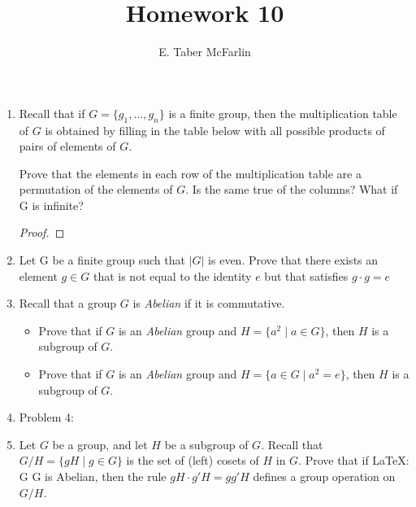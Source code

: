 \documentclass[12pt,a4paper,reqno,parskip=full]{amsart}
\numberwithin{equation}{section}
\theoremstyle{plain}
\theoremstyle{definition}
\begin{document}
\title{Homework 10}

\author{E. Taber McFarlin}

\maketitle

\begin{enumerate}
  \item Recall that if $G=\{g_1,\ldots,g_n\}$ is a finite group, then the
        multiplication table of $G$ is obtained by filling in the table below
        with all possible products of pairs of elements of $G$.

        Prove that the elements in each row of the multiplication table are a
        permutation of the elements of $G$. Is the same true of the columns?
        What if G is infinite?

        \begin{proof}

        \end{proof}

  \item Let G be a finite group such that $|G|$ is even. Prove that there exists
        an element $g\in G$ that is not equal to the identity $e$ but that
        satisfies $g\cdot g=e$

  \item Recall that a group $G$ is \emph{Abelian} if it is commutative.
        \begin{itemize}
          \item Prove that if $G$ is an \emph{Abelian} group and
                $H=\{a^2\mid a\in G\}$, then $H$ is a subgroup of $G$.
          \item Prove that if $G$ is an \emph{Abelian} group and
                $H=\{a\in G\mid a^2=e\}$, then $H$ is a subgroup of $G$.
        \end{itemize}

  \item Problem 4:

  \item Let $G$ be a group, and let $H$ be a subgroup of $G$. Recall that
        $G/H=\{gH\mid g\in G\}$ is the set of (left) cosets of $H$ in $G$.
        Prove that if LaTeX: G G  is Abelian, then the rule $gH\cdot g'H=gg'H$
        defines a group operation on $G/H$.
\end{enumerate}
\end{document}
